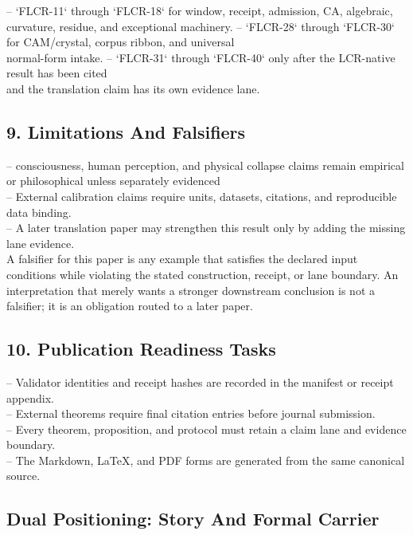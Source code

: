\documentclass[11pt]{article}
\begin{document}
\noindent{}-- `FLCR-11` through `FLCR-18` for window, receipt, admission, CA, algebraic,\\
  curvature, residue, and exceptional machinery.
\noindent{}-- `FLCR-28` through `FLCR-30` for CAM/crystal, corpus ribbon, and universal\\
  normal-form intake.
\noindent{}-- `FLCR-31` through `FLCR-40` only after the LCR-native result has been cited\\
  and the translation claim has its own evidence lane.

\subsection*{9. Limitations And Falsifiers}

\noindent{}-- consciousness, human perception, and physical collapse claims remain empirical or philosophical unless separately evidenced\\
\noindent{}-- External calibration claims require units, datasets, citations, and reproducible data binding.\\
\noindent{}-- A later translation paper may strengthen this result only by adding the missing lane evidence.\\

A falsifier for this paper is any example that satisfies the declared input
conditions while violating the stated construction, receipt, or lane boundary.
An interpretation that merely wants a stronger downstream conclusion is not a
falsifier; it is an obligation routed to a later paper.

\subsection*{10. Publication Readiness Tasks}

\noindent{}-- Validator identities and receipt hashes are recorded in the manifest or receipt appendix.\\
\noindent{}-- External theorems require final citation entries before journal submission.\\
\noindent{}-- Every theorem, proposition, and protocol must retain a claim lane and evidence boundary.\\
\noindent{}-- The Markdown, LaTeX, and PDF forms are generated from the same canonical source.\\

\subsection*{Dual Positioning: Story And Formal Carrier}
\end{document}

